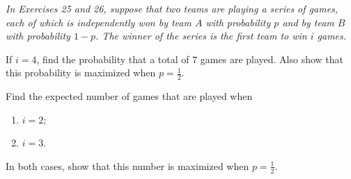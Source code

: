 \noindent
\textit{In Exercises 25 and 26, suppose that two teams are playing a series of games, each of which is independently won by team $A$ with probability $p$ and by team $B$ with probability $1-p$. The winner of the series is the first team to win $i$ games.}

\begin{exercise}
\label{ex:random-variables-25}
If $i = 4$, find the probability that a total of $7$ games are played. Also show that this probability is maximized when $p = \frac{1}{2}$.
\end{exercise}


\begin{exercise}
\label{ex:random-variables-26}
Find the expected number of games that are played when
\begin{enumerate}
    \item [(a)] $i = 2$;
    \item [(b)] $i = 3$.
\end{enumerate}
In both cases, show that this number is maximized when $p = \frac{1}{2}$.
\end{exercise}

